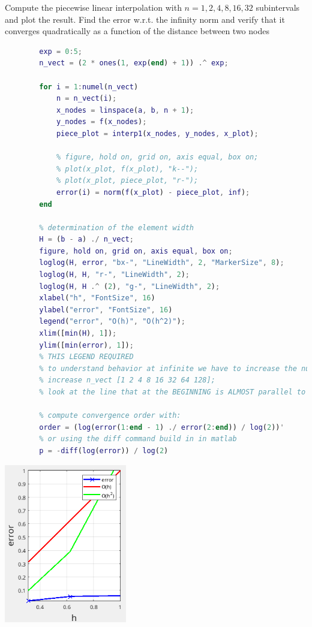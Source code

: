         Compute the piecewise linear interpolation with $n=1,2,4,8,16,32$ subintervals and plot the result. Find the error w.r.t. the infinity norm and verify that it converges quadratically as a function of the distance between two nodes
        \begin{lstlisting}[language=Matlab, escapeinside=`', gobble=8]
        % piecewise linear
        exp = 0:5;
        n_vect = (2 * ones(1, exp(end) + 1)) .^ exp;

        for i = 1:numel(n_vect)
            n = n_vect(i);
            x_nodes = linspace(a, b, n + 1);
            y_nodes = f(x_nodes);
            piece_plot = interp1(x_nodes, y_nodes, x_plot);

            % figure, hold on, grid on, axis equal, box on;
            % plot(x_plot, f(x_plot), "k--");
            % plot(x_plot, piece_plot, "r-");
            error(i) = norm(f(x_plot) - piece_plot, inf);
        end

        % determination of the element width
        H = (b - a) ./ n_vect;
        figure, hold on, grid on, axis equal, box on;
        loglog(H, error, "bx-", "LineWidth", 2, "MarkerSize", 8);
        loglog(H, H, "r-", "LineWidth", 2);
        loglog(H, H .^ (2), "g-", "LineWidth", 2);
        xlabel("h", "FontSize", 16)
        ylabel("error", "FontSize", 16)
        legend("error", "O(h)", "O(h^2)");
        xlim([min(H), 1]);
        ylim([min(error), 1]);
        % THIS LEGEND REQUIRED
        % to understand behavior at infinite we have to increase the number of subinterval
        % increase n_vect [1 2 4 8 16 32 64 128];
        % look at the line that at the BEGINNING is ALMOST parallel to the error line

        % compute convergence order with:
        order = (log(error(1:end - 1) ./ error(2:end)) / log(2))'
        % or using the diff command build in in matlab
        p = -diff(log(error)) / log(2)
        \end{lstlisting}
        \begin{center}
            \includegraphics[width=0.4\textwidth]{images/code_runge_error.png}
        \end{center}

